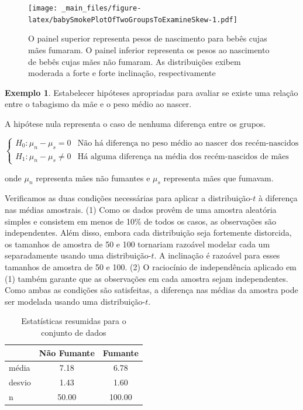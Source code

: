 \documentclass[
]{book}
\theoremstyle{definition}
\theoremstyle{definition}
\newtheorem{example}{Exemplo}[chapter]
\theoremstyle{definition}
\theoremstyle{definition}
\theoremstyle{remark}
\begin{document}
\begin{figure}
\centering
\texttt{[image: \_main\_files/figure-latex/babySmokePlotOfTwoGroupsToExamineSkew-1.pdf]}
\caption{\label{fig:babySmokePlotOfTwoGroupsToExamineSkew}O painel superior representa pesos de nascimento para bebês cujas mães fumaram. O painel inferior representa os pesos ao nascimento de bebês cujas mães não fumaram. As distribuições exibem moderada a forte e forte inclinação, respectivamente}
\end{figure}

\begin{example}
\protect\hypertarget{exm:babySmokeHTForWeight}{}{\label{exm:babySmokeHTForWeight} }Estabelecer hipóteses apropriadas para avaliar se existe uma relação entre o tabagismo da mãe e o peso médio ao nascer.
\end{example}

A hipótese nula representa o caso de nenhuma diferença entre os grupos.

\[
\begin{cases}
  H_0: \mu_{n} - \mu_{s} = 0 & \mbox{Não há diferença no peso médio ao nascer dos recém-nascidos de mães que fumavam ou não} \\
  H_1: \mu_{n} - \mu_{s} \neq 0 & \mbox{Há alguma diferença na média dos recém-nascidos de mães que fumavam e não fumavam}
\end{cases}
\]

onde \(\mu_{n}\) representa mães não fumantes e \(\mu_s\) representa mães que fumavam.

Verificamos as duas condições necessárias para aplicar a distribuição-\(t\) à diferença nas médias amostrais. (1) Como os dados provêm de uma amostra aleatória simples e consistem em menos de 10\% de todos os casos, as observações são independentes. Além disso, embora cada distribuição seja fortemente distorcida, os tamanhos de amostra de 50 e 100 tornariam razoável modelar cada um separadamente usando uma distribuição-\(t\). A inclinação é razoável para esses tamanhos de amostra de 50 e 100. (2) O raciocínio de independência aplicado em (1) também garante que as observações em cada amostra sejam independentes. Como ambas as condições são satisfeitas, a diferença nas médias da amostra pode ser modelada usando uma distribuição-\(t\).

\begin{table}

\caption{\label{tab:summaryStatsOfBirthWeightForNewbornsFromSmokingAndNonsmokingMothers}Estatísticas resumidas para o conjunto de dados}
\centering
\begin{tabular}[t]{l|c|c}
\hline
  & Não Fumante & Fumante\\
\hline
média & 7.18 & 6.78\\
\hline
desvio & 1.43 & 1.60\\
\hline
n & 50.00 & 100.00\\
\hline
\end{tabular}
\end{table}
\end{document}
